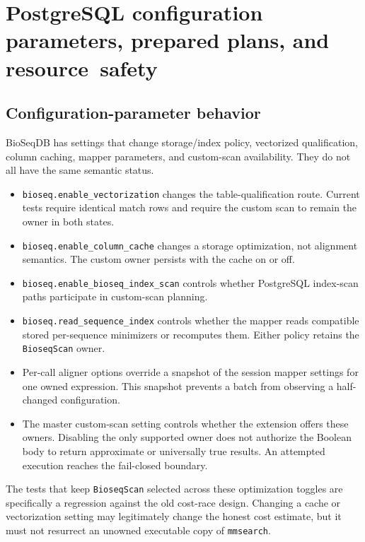 \section[PostgreSQL configuration parameters, prepared plans, and resource
safety]{PostgreSQL configuration parameters, prepared plans, and
\mbox{resource safety}}
\label{sec:customscan-safety}

\subsection{Configuration-parameter behavior}

BioSeqDB has settings that change storage/index policy, vectorized
qualification, column caching, mapper parameters, and custom-scan
availability.  They do not all have the same semantic status.

\begin{itemize}
  \item \texttt{bioseq.enable\_vectorization} changes the table-qualification
  route.  Current tests require identical match rows and require the custom
  scan to remain the owner in both states.
  \item \texttt{bioseq.enable\_column\_cache} changes a storage optimization,
  not alignment semantics.  The custom owner persists with the cache on or
  off.
  \item \texttt{bioseq.enable\_bioseq\_index\_scan} controls whether
  PostgreSQL index-scan paths participate in custom-scan planning.
  \item \texttt{bioseq.read\_sequence\_index} controls whether the mapper reads
  compatible stored per-sequence minimizers or recomputes them. Either policy
  retains the \texttt{BioseqScan} owner.
  \item Per-call aligner options override a snapshot of the session mapper
  settings for one owned expression.  This snapshot prevents a batch from
  observing a half-changed configuration.
  \item The master custom-scan setting controls whether the extension offers
  these owners.  Disabling the only supported owner does not authorize the
  Boolean body to return approximate or universally true results.  An
  attempted execution reaches the fail-closed boundary.
\end{itemize}

The tests that keep \texttt{BioseqScan} selected across these optimization
toggles are specifically a regression against the old cost-race design.
Changing a cache or vectorization setting may legitimately change the honest
cost estimate, but it must not resurrect an unowned executable copy of
\texttt{mmsearch}.

